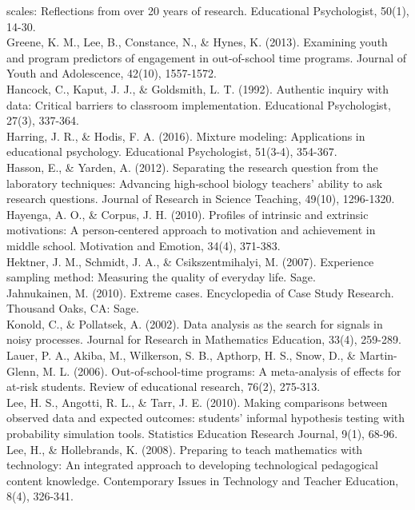\documentclass[]{msu-thesis}
\theoremstyle{definition}
\theoremstyle{definition}
\theoremstyle{definition}
\theoremstyle{remark}
\begin{document}
scales: Reflections from over 20 years of research. Educational
Psychologist, 50(1), 14-30.\\
Greene, K. M., Lee, B., Constance, N., \& Hynes, K. (2013). Examining
youth and program predictors of engagement in out-of-school time
programs. Journal of Youth and Adolescence, 42(10), 1557-1572.\\
Hancock, C., Kaput, J. J., \& Goldsmith, L. T. (1992). Authentic inquiry
with data: Critical barriers to classroom implementation. Educational
Psychologist, 27(3), 337-364.\\
Harring, J. R., \& Hodis, F. A. (2016). Mixture modeling: Applications
in educational psychology. Educational Psychologist, 51(3-4), 354-367.\\
Hasson, E., \& Yarden, A. (2012). Separating the research question from
the laboratory techniques: Advancing high‐school biology teachers'
ability to ask research questions. Journal of Research in Science
Teaching, 49(10), 1296-1320.\\
Hayenga, A. O., \& Corpus, J. H. (2010). Profiles of intrinsic and
extrinsic motivations: A person-centered approach to motivation and
achievement in middle school. Motivation and Emotion, 34(4), 371-383.\\
Hektner, J. M., Schmidt, J. A., \& Csikszentmihalyi, M. (2007).
Experience sampling method: Measuring the quality of everyday life.
Sage.\\
Jahnukainen, M. (2010). Extreme cases. Encyclopedia of Case Study
Research. Thousand Oaks, CA: Sage.\\
Konold, C., \& Pollatsek, A. (2002). Data analysis as the search for
signals in noisy processes. Journal for Research in Mathematics
Education, 33(4), 259-289.\\
Lauer, P. A., Akiba, M., Wilkerson, S. B., Apthorp, H. S., Snow, D., \&
Martin-Glenn, M. L. (2006). Out-of-school-time programs: A meta-analysis
of effects for at-risk students. Review of educational research, 76(2),
275-313.\\
Lee, H. S., Angotti, R. L., \& Tarr, J. E. (2010). Making comparisons
between observed data and expected outcomes: students' informal
hypothesis testing with probability simulation tools. Statistics
Education Research Journal, 9(1), 68-96.\\
Lee, H., \& Hollebrands, K. (2008). Preparing to teach mathematics with
technology: An integrated approach to developing technological
pedagogical content knowledge. Contemporary Issues in Technology and
Teacher Education, 8(4), 326-341.\\
\end{document}
